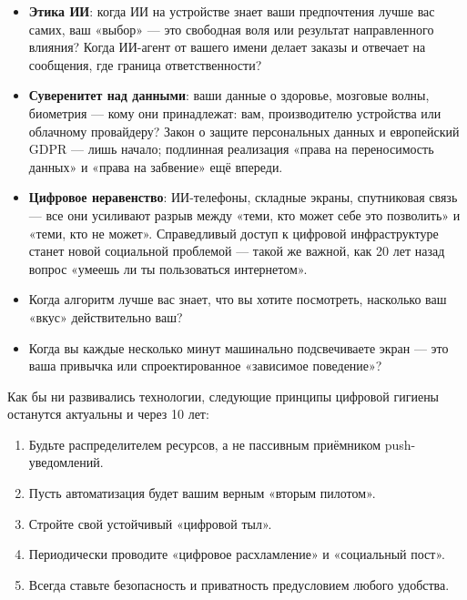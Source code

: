 \begin{itemize}
  \item \textbf{Этика ИИ}: когда ИИ на устройстве знает ваши предпочтения лучше вас самих, ваш «выбор» — это свободная воля или результат направленного влияния? Когда ИИ-агент от вашего имени делает заказы и отвечает на сообщения, где граница ответственности?
  \item \textbf{Суверенитет над данными}: ваши данные о здоровье, мозговые волны, биометрия — кому они принадлежат: вам, производителю устройства или облачному провайдеру? Закон о защите персональных данных и европейский GDPR — лишь начало; подлинная реализация «права на переносимость данных» и «права на забвение» ещё впереди.
  \item \textbf{Цифровое неравенство}: ИИ-телефоны, складные экраны, спутниковая связь — все они усиливают разрыв между «теми, кто может себе это позволить» и «теми, кто не может». Справедливый доступ к цифровой инфраструктуре станет новой социальной проблемой — такой же важной, как 20 лет назад вопрос «умеешь ли ты пользоваться интернетом».
  \item Когда алгоритм лучше вас знает, что вы хотите посмотреть, насколько ваш «вкус» действительно ваш?
  \item Когда вы каждые несколько минут машинально подсвечиваете экран — это ваша привычка или спроектированное «зависимое поведение»?
\end{itemize}


Как бы ни развивались технологии, следующие принципы цифровой гигиены останутся актуальны и через 10 лет:

\begin{enumerate}
  \item Будьте распределителем ресурсов, а не пассивным приёмником push-уведомлений.
  \item Пусть автоматизация будет вашим верным «вторым пилотом».
  \item Стройте свой устойчивый «цифровой тыл».
  \item Периодически проводите «цифровое расхламление» и «социальный пост».
  \item Всегда ставьте безопасность и приватность предусловием любого удобства.
\end{enumerate}

